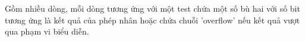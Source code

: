 Gồm nhiều dòng, mỗi dòng tương ứng với một test chứa một số bù hai với số bit tương ứng là kết quả của phép nhân hoặc chứa chuỗi 'overflow' nếu kết quả vượt qua phạm vi biểu diễn.

\